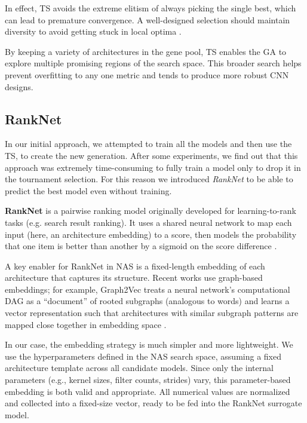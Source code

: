 In effect, TS avoids the extreme elitism of always picking the single best, which can lead to premature convergence. A well-designed selection should maintain diversity to avoid getting stuck in local optima \cite{filipovic2003fine}.

By keeping a variety of architectures in the gene pool, TS enables the GA to explore multiple promising regions of the search space. This broader search helps prevent overfitting to any one metric and tends to produce more robust CNN designs.


\subsection{RankNet}

In our initial approach, we attempted to train all the models and then use the TS, to create the new generation. After some experiments, we find out that this approach was extremely time-consuming to fully train a model only to drop it in the tournament selection. For this reason we introduced \textit{RankNet} to be able to predict the best model even without training.


\textbf{RankNet} is a pairwise ranking model originally developed for learning-to-rank tasks (e.g. search result ranking). It uses a shared neural network to map each input (here, an architecture embedding) to a score, then models the probability that one item is better than another by a sigmoid on the score difference \cite{RankNet}.

A key enabler for RankNet in NAS is a fixed-length embedding of each architecture that captures its structure. Recent works use graph-based embeddings; for example, Graph2Vec treats a neural network’s computational DAG as a “document” of rooted subgraphs (analogous to words) and learns a vector representation such that architectures with similar subgraph patterns are mapped close together in embedding space \cite{RankNet}.

In our case, the embedding strategy is much simpler and more lightweight. We use the hyperparameters defined in the NAS search space, assuming a fixed architecture template across all candidate models. Since only the internal parameters (e.g., kernel sizes, filter counts, strides) vary, this parameter-based embedding is both valid and appropriate. All numerical values are normalized and collected into a fixed-size vector, ready to be fed into the RankNet surrogate model.

